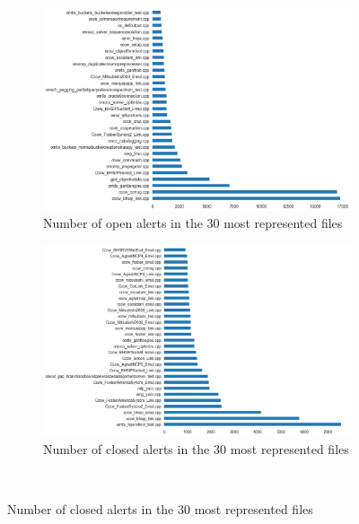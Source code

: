 \begin{figure}[H]
\begin{subfigure}{0.5\textwidth}
		\centering
		\includegraphics[scale=0.2]{./src/data_analysis/closed_files_barh.jpg}
		\caption{Number of open alerts in the 30 most represented files}\label{}
	\end{subfigure}%
	\begin{subfigure}{0.5\textwidth}
		\centering
		\includegraphics[scale=0.2]{./src/data_analysis/open_file_barh.jpg}
		\caption{Number of closed alerts in the 30 most represented files}\label{}
	\end{subfigure}\\
\end{figure}


